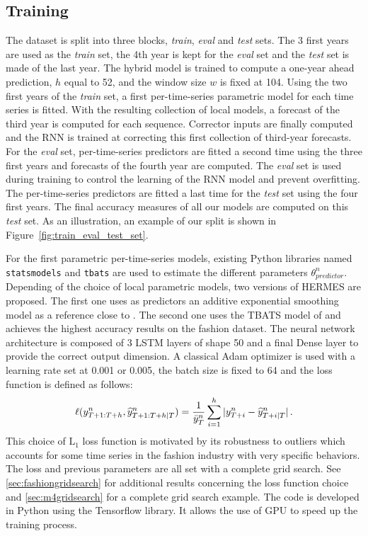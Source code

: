 \documentclass[review]{elsarticle}
\newcommand{\ts}{y}
\newcommand{\tspred}{\widehat{\ts}}
\newcommand{\statparam}{\theta_{predictor}}
\newcommand{\lag}{h}
\newcommand{\window}{w}
\newcommand{\meants}{\Bar{\ts}}
\begin{document}
\subsection{Training}
The dataset is split into three blocks, {\em train}, {\em eval} and {\em test} sets. The 3 first years are used as the {\em train} set, the 4th year is kept for the {\em eval} set and the {\em test} set is made of the last year. The hybrid model is trained to compute a one-year ahead prediction, $\lag$ equal to 52, and the window size $\window$ is fixed at 104.
Using the two first years of the {\em train} set, a first per-time-series parametric model for each time series is fitted. With the resulting collection of local models, a forecast of the third year is computed for each sequence. Corrector inputs are finally computed and the RNN is trained at correcting this first collection of third-year forecasts. For the {\em eval} set, per-time-series predictors are fitted a second time using the three first years and forecasts of the fourth year are computed. The {\em eval} set is used during  training to control the learning of the RNN model and prevent overfitting. The per-time-series predictors are fitted a last time for the {\em test} set using the four first years. The final accuracy measures of all our models are computed on this {\em test} set. As an illustration, an example of our split is shown in Figure~\ref{fig:train_eval_test_set}.

For the first parametric per-time-series models, existing Python  libraries named \texttt{statsmodels} and  \texttt{tbats} are used to estimate the different parameters $\statparam^n$.  Depending of the choice of local parametric models, two versions of HERMES are proposed. The first one uses as predictors an additive exponential smoothing model as a reference close to \cite{smyl2020}. The second one uses the TBATS model of \cite{alysha2011} and  achieves the highest accuracy results on the fashion dataset. The neural network architecture is composed of 3 LSTM layers of shape 50 and a final Dense layer to provide the correct output dimension. A classical Adam optimizer is used with a learning rate set at 0.001 or 0.005, the batch size is fixed to 64 and the loss function is defined as follows:
$$
\ell(\ts^n_{T+1:T+\lag},\tspred^n_{T+1:T+\lag|T}) = \frac{1}{\meants^n_T}\sum_{i=1}^{\lag}|\ts^n_{T+i} - \tspred^n_{T+i|T}|\,.
$$
This choice of $\mathrm{L}_1$ loss function is motivated by its robustness to outliers which accounts for some time series in the fashion industry with very specific behaviors. The loss and previous parameters are all set with a complete grid search. See \ref{sec:fashiongridsearch} for additional results concerning the loss function choice and \ref{sec:m4gridsearch} for a complete grid search example. The code is developed in Python using the Tensorflow library. It allows the use of GPU to speed up the training process.
\end{document}
